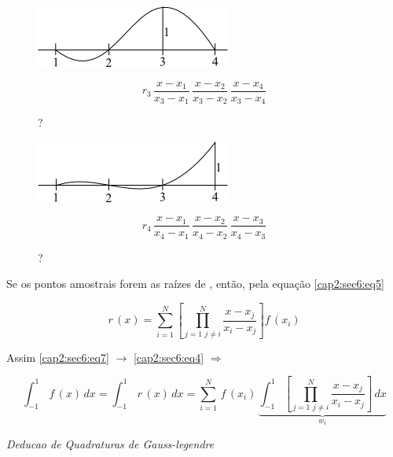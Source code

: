 \begin{enumerate}
\begin{example}
\begin{figure}[htb]
 \centering
 \begin{minipage}[c]{7cm}
    \includegraphics[scale=0.9]{capitulos/capitulo2/figuras/quadraturas_de_gauss4.png}
    \caption{?}
    \label{fig:quadraturas_de_gauss4}
 \end{minipage}\hspace*{1cm}
 \begin{minipage}[c]{6cm}
    \[
     r_3 \, \frac{x-x_1}{x_3-x_1} \, \frac{x-x_2}{x_3-x_2} \, \frac{x-x_4}{x_3-x_4}
    \]
 \end{minipage}
\end{figure}

\begin{figure}[htb]
 \centering
 \begin{minipage}[c]{7cm}
    \includegraphics[scale=0.9]{capitulos/capitulo2/figuras/quadraturas_de_gauss5.png}
    \caption{?}
    \label{fig:quadraturas_de_gauss5}
 \end{minipage}\hspace*{1cm}
 \begin{minipage}[c]{6cm}
    \[
     r_4 \, \frac{x-x_1}{x_4-x_1} \, \frac{x-x_2}{x_4-x_2} \, \frac{x-x_3}{x_4-x_3}
    \]
 \end{minipage}
\end{figure}

\end{example}

Se os pontos amostrais forem as  raízes de , então, pela equação \ref{cap2:sec6:eq5}

\begin{equation}
 \label{cap2:sec6:eq7}
 r\,(x) =
 \sum_{i=1}^N \left[
  \prod_{
    j=1 \,\, j \neq i
  }^N
  \frac{x-x_j}{x_i-x_j}
 \right]
 f\,(x_i)
\end{equation}

Assim \ref{cap2:sec6:eq7} $\rightarrow$ \ref{cap2:sec6:eq4} $\Rightarrow$

\[
 \int_{-1}^1 \, f\,(x) \, dx = \int_{-1}^1 \, r\,(x) \, dx = \sum_{i=1}^N \, f\,(x_i) \,
 \underbrace{
 \int_{-1}^1 \left[
  \prod_{
    j=1 \,\, j \neq i
  }^N
  \frac{x-x_j}{x_i-x_j}
 \right]
 \, dx
 }_{
  w_i
 }
\]
\begin{example}
 \emph{ Deducao de Quadraturas de Gauss-legendre } 


\end{example}
\end{enumerate}
